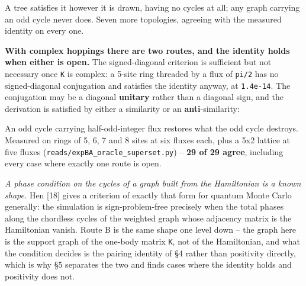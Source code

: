\documentclass[10pt,letterpaper,twocolumn]{article}
\begin{document}
A tree satisfies it however it is drawn, having no cycles at all; any graph carrying an odd cycle
never does. Seven more topologies, agreeing with the measured identity on every one.

\textbf{With complex hoppings there are two routes, and the identity holds when either is open.} The
signed-diagonal criterion is sufficient but not necessary once \texttt{K} is complex: a 5-site ring
threaded by a flux of \texttt{pi/\allowbreak{}2} has no signed-diagonal conjugation and satisfies the identity anyway,
at \texttt{1.\allowbreak{}4e-{}\allowbreak{}14}. The conjugation may be a diagonal \textbf{unitary} rather than a diagonal sign, and the
derivation is satisfied by either a similarity or an \textbf{anti}-similarity:


An odd cycle carrying half-odd-integer flux restores what the odd cycle destroys. Measured on rings
of 5, 6, 7 and 8 sites at six fluxes each, plus a 5x2 lattice at five fluxes
(\texttt{reads/\allowbreak{}expBA\_\allowbreak{}oracle\_\allowbreak{}superset.\allowbreak{}py}) -- \textbf{29 of 29 agree},
including every case where exactly one route is open.

\emph{A phase condition on the cycles of a graph built from the Hamiltonian is a known shape.} Hen {[}18{]}
gives a criterion of exactly that form for quantum Monte
Carlo generally: the simulation is sign-problem-free precisely when the total phases along the
chordless cycles of the weighted graph whose adjacency matrix is the Hamiltonian vanish. Route B is
the same shape one level down -- the graph here is the support graph of the one-body matrix \texttt{K},
not of the Hamiltonian, and what the condition decides is the pairing identity of §4 rather than
positivity directly, which is why §5 separates the two and finds cases where the identity holds
and positivity does not.
\end{document}
